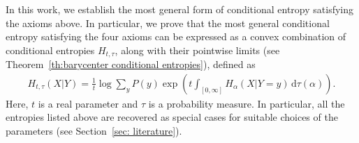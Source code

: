 \documentclass[aps,pra,11pt,onecolumn,nofootinbib,tightenlines]{revtex4-2}
\theoremstyle{definition}
\renewcommand{\H}{\mathbb{H}}
\begin{document}


In this work, we establish the most general form of conditional entropy satisfying the axioms above. In particular, we prove that the most general conditional entropy satisfying the four axioms can be expressed as a convex combination of conditional entropies $H_{t,\tau}$, along with their pointwise limits (see Theorem~\ref{th:barycenter conditional entropies}), defined as
\begin{align}
    H_{t,\tau}(X|Y) = \frac{1}{t}\log \sum_{y} P(y)\exp\!\left( t \int_{[0,\infty]} H_\alpha(X|Y\!=\!y)\, \mathrm{d}\tau(\alpha) \right).
    \label{eq:General}
\end{align}
Here, $t$ is a real parameter and $\tau$ is a probability measure.
In particular, all the entropies listed above are recovered as special cases for suitable choices of the parameters (see Section~\ref{sec: literature}).
\end{document}
